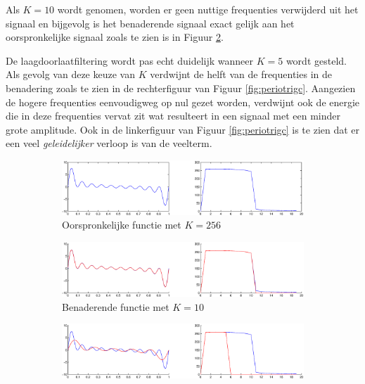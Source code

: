 \documentclass[a4paper]{article}
\begin{document}
Als $K=10$ wordt genomen, worden er geen nuttige frequenties verwijderd uit het signaal en bijgevolg is het benaderende signaal exact gelijk aan het oorspronkelijke signaal zoals te zien is in Figuur \ref{fig:periotrigb}.

De laagdoorlaatfiltering wordt pas echt duidelijk wanneer $K=5$ wordt gesteld. Als gevolg van deze keuze van $K$ verdwijnt de helft van de frequenties in de benadering zoals te zien in de rechterfiguur van Figuur \ref{fig:periotrigc}. Aangezien de hogere frequenties eenvoudigweg op nul gezet worden, verdwijnt ook de energie die in deze frequenties vervat zit wat resulteert in een signaal met een minder grote amplitude. Ook in de linkerfiguur van Figuur \ref{fig:periotrigc} is te zien dat er een veel \textit{geleidelijker} verloop is van de veelterm.
\begin{figure}
    \centering
    \begin{subfigure}[b]{\textwidth}
        \centering
        \includegraphics[width=\textwidth, height=0.3\textwidth]{periotriga.eps}
        \caption{Oorspronkelijke functie met $K=256$}
        \label{fig:periotriga}
        \vspace*{1cm}
    \end{subfigure}
    \begin{subfigure}[b]{\textwidth}
        \centering
        \includegraphics[width=\textwidth]{periotrigb.eps}
        \caption{Benaderende functie met $K=10$}
        \label{fig:periotrigb}
        \vspace*{1cm}
    \end{subfigure}
    \hfill
    \begin{subfigure}[b]{\textwidth}
        \centering
        \includegraphics[width=\textwidth]{periotrigc.eps}

\end{subfigure}
\end{figure}
\end{document}
